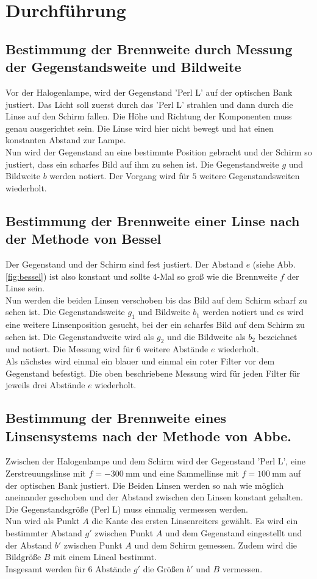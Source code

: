 \section{Durchführung}
\label{sec:Durchführung}
\subsection{Bestimmung der Brennweite durch Messung der Gegenstandsweite und Bildweite}
Vor der Halogenlampe, wird der Gegenstand 'Perl L' auf der optischen Bank justiert.
Das Licht soll zuerst durch das 'Perl L' strahlen und dann durch die Linse auf den Schirm fallen.
Die Höhe und Richtung der Komponenten muss genau ausgerichtet sein.
Die Linse wird hier nicht bewegt und hat einen konstanten Abstand zur Lampe.
\\
Nun wird der Gegenstand an eine bestimmte Position gebracht und der Schirm so justiert, dass ein scharfes Bild auf ihm zu sehen ist.
Die Gegenstandweite $g$ und Bildweite $b$ werden notiert.
Der Vorgang wird für $5$ weitere Gegenstandsweiten wiederholt.
\FloatBarrier

\subsection{Bestimmung der Brennweite einer Linse nach der Methode von Bessel}
Der Gegenstand und der Schirm sind fest justiert.
Der Abstand $e$ (siehe Abb. \ref{fig:bessel}) ist also konstant und sollte 4-Mal so groß wie die Brennweite $f$ der Linse sein.
\\
Nun werden die beiden Linsen verschoben bis das Bild auf dem Schirm scharf zu sehen ist.
Die Gegenstandsweite $g_1$ und Bildweite $b_1$ werden notiert und es wird eine weitere Linsenposition gesucht, bei der ein scharfes Bild auf dem Schirm zu sehen ist.
Die Gegenstandweite wird als $g_2$ und die Bildweite als $b_2$ bezeichnet und notiert.
Die Messung wird für $6$ weitere Abstände $e$ wiederholt.
\\
Als nächstes wird einmal ein blauer und einmal ein roter Filter vor dem Gegenstand befestigt.
Die oben beschriebene Messung wird für jeden Filter für jeweils drei Abstände $e$ wiederholt.
\FloatBarrier

\subsection{Bestimmung der Brennweite eines Linsensystems nach der Methode von Abbe.}
Zwischen der Halogenlampe und dem Schirm wird der Gegenstand 'Perl L', eine Zerstreuungslinse mit $f = \SI{-300}{\milli\metre}$ und eine Sammellinse mit $f = \SI{100}{\milli\metre}$ auf der optischen Bank justiert.
Die Beiden Linsen werden so nah wie möglich aneinander geschoben und der Abstand zwischen den Linsen konstant gehalten.
Die Gegenstandsgröße (Perl L) muss einmalig vermessen werden.\\
Nun wird als Punkt $A$ die Kante des ersten Linsenreiters gewählt.
Es wird ein bestimmter Abstand $g'$ zwischen Punkt $A$ und dem Gegenstand eingestellt und der Abstand $b'$ zwischen Punkt $A$ und dem Schirm gemessen.
Zudem wird die Bildgröße $B$ mit einem Lineal bestimmt.\\
Insgesamt werden für $6$ Abstände $g'$ die Größen $b'$ und $B$ vermessen.